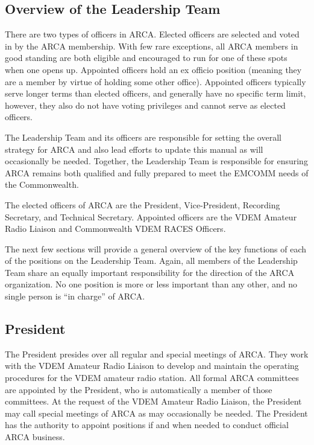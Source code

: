 \documentclass[pdflatex,letterpaper,twoside,12pt]{book}
\begin{document}
\subsection{Overview of the Leadership Team}

There are two types of officers in ARCA.  Elected officers are selected and voted in by the ARCA membership.  With few rare exceptions, all ARCA members in good standing are both eligible and encouraged to run for one of these spots when one opens up.  Appointed officers hold an ex officio position (meaning they are a member by virtue of holding some other office).  Appointed officers typically serve longer terms than elected officers, and generally have no specific term limit, however, they also do not have voting privileges and cannot serve as elected officers.

The Leadership Team and its officers are responsible for setting the overall strategy for ARCA and also lead efforts to update this manual as will occasionally be needed.  Together, the Leadership Team is responsible for ensuring ARCA remains both qualified and fully prepared to meet the EMCOMM needs of the Commonwealth.

The elected officers of ARCA are the President, Vice-President, Recording Secretary, and Technical Secretary.  Appointed officers are the VDEM Amateur Radio Liaison and Commonwealth VDEM RACES Officers.

The next few sections will provide a general overview of the key functions of each of the positions on the Leadership Team.  Again, all members of the Leadership Team share an equally important responsibility for the direction of the ARCA organization.  No one position is more or less important than any other, and no single person is ``in charge'' of ARCA.

\subsection{President}

The President presides over all regular and special meetings of ARCA.  They work with the VDEM Amateur Radio Liaison to develop and maintain the operating procedures for the VDEM amateur radio station.  All formal ARCA committees are appointed by the President, who is automatically a member of those committees.  At the request of the VDEM Amateur Radio Liaison, the President may call special meetings of ARCA as may occasionally be needed.  The President has the authority to appoint positions if and when needed to conduct official ARCA business.
\end{document}
